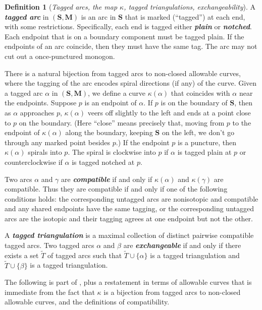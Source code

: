 \documentclass{amsart}
\theoremstyle{definition}
\newtheorem{definition}[proposition]{Definition}
\theoremstyle{remark}
\numberwithin{equation}{section}
\newcommand{\newword}[1]{\textbf{\emph{#1}}}
\newcommand{\set}[1]{{\lbrace #1 \rbrace}}
\newcommand{\0}{{\mathbf{0}}}
\newcommand{\M}{\mathbf{M}}
\renewcommand{\S}{\mathbf{S}}
\begin{document}
\begin{definition}[\emph{Tagged arcs, the map $\kappa$, tagged triangulations, exchangeability}]\label{tagged tri def}
A \newword{tagged arc} in $(\S,\M)$ is an arc in $\S$ that is marked (``tagged'') at each end, with some restrictions.
Specifically, each end is tagged either \newword{plain} or \newword{notched}.
Each endpoint that is on a boundary component must be tagged plain.
If the endpoints of an arc coincide, then they must have the same tag.
The arc may not cut out a once-punctured monogon.

There is a natural bijection from tagged arcs to non-closed allowable curves, where the tagging of the arc encodes spiral directions (if any) of the curve.
Given a tagged arc $\alpha$ in $(\S,\M)$, we define a curve $\kappa(\alpha)$ that coincides with $\alpha$ near the endpoints.
Suppose $p$ is an endpoint of $\alpha$. 
If $p$ is on the boundary of $\S$, then as $\alpha$ approaches $p$, $\kappa(\alpha)$ veers off slightly to the left and ends at a point close to $p$ on the boundary.
(Here ``close'' means precisely that, moving from $p$ to the endpoint of $\kappa(\alpha)$ along the boundary, keeping $\S$ on the left, we don't go through any marked point besides $p$.)
If the endpoint $p$ is a puncture, then $\kappa(\alpha)$ spirals into $p$.
The spiral is clockwise into $p$ if $\alpha$ is tagged plain at $p$ or counterclockwise if $\alpha$ is tagged notched at $p$.

Two arcs $\alpha$ and $\gamma$ are \newword{compatible} if and only if $\kappa(\alpha)$ and $\kappa(\gamma)$ are compatible.
Thus they are compatible if and only if one of the following conditions holds:
the corresponding untagged arcs are nonisotopic and compatible and any shared endpoints have the same tagging, or
the corresponding untagged arcs are the isotopic and their tagging agrees at one endpoint but not the other.

A \newword{tagged triangulation} is a maximal collection of distinct pairwise compatible tagged arcs.
Two tagged arcs $\alpha$ and $\beta$ are \newword{exchangeable} if and only if there exists a set $\widetilde T$ of tagged arcs such that $\widetilde T\cup\set{\alpha}$ is a tagged triangulation and $\widetilde T\cup\set{\beta}$ is a tagged triangulation.
\end{definition}

The following is part of \cite[Theorem~7.9]{cats1}, plus a restatement in terms of allowable curves that is immediate from the fact that $\kappa$ is a bijection from tagged arcs to non-closed allowable curves, and the definitions of compatibility.
\end{document}
